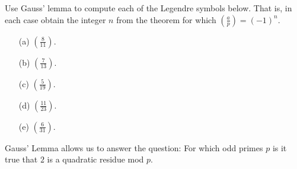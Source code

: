 \documentclass[oneside,12pt]{amsart}
\begin{document}
\begin{homework}
Use Gauss' lemma to compute each of the Legendre symbols below. That is, in each case
obtain the integer $n$ from the theorem for which $\left( \frac{a}{p} \right) = (-1)^n$.
\begin{enumerate}
\item[(a)] $\left( \frac{8}{11} \right)$.
\item[(b)] $\left( \frac{7}{13} \right)$.
\item[(c)] $\left( \frac{5}{19} \right)$. 
\item[(d)] $\left( \frac{11}{23} \right)$. 
\item[(e)] $\left( \frac{6}{31} \right)$.
\end{enumerate}
\end{homework}

Gauss' Lemma allows us to answer the question: For which odd primes $p$ is it true that $2$ is a quadratic residue mod $p$.
\end{document}
